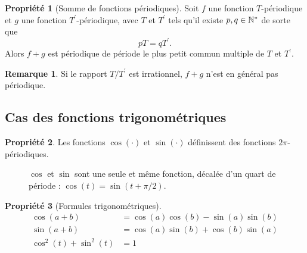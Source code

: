\documentclass[a4paper,11pt]{article}
\theoremstyle{definition}
\newtheorem{proposition}{Propriété}[section]
\newtheorem{remark}{Remarque}[section]
\begin{document}
\begin{proposition}[Somme de fonctions périodiques]
    Soit $f$ une fonction $T$-périodique et $g$ une fonction $T^\prime$-périodique, avec $T$ et $T^\prime$ tels qu'il existe $p,q\in{\mathbb{N}}^*$ de sorte que
    $$
        pT = qT^\prime.
    $$
    Alors $f+g$ est périodique de période le plus petit commun multiple de $T$ et $T^\prime$.
\end{proposition}

\begin{remark}
    Si le rapport $T/T^\prime$ est irrationnel, $f+g$ n'est en général pas périodique.
\end{remark}


\subsection{Cas des fonctions trigonométriques}


\begin{proposition}
    Les fonctions $\cos(\cdot)$ et $\sin(\cdot)$ définissent des fonctions $2\pi$-périodiques.
\end{proposition}

\begin{figure}[h]
    \centering
    \caption{$\cos$ et $\sin$ sont une seule et même fonction, décalée d'un quart de période : $\cos(t) = \sin(t+\pi/2)$.}
\end{figure}

\begin{proposition}[Formules trigonométriques]

    $$
    \begin{aligned}
        \cos(a+b) &= \cos(a)\cos(b) - \sin(a)\sin(b)\\
        \sin(a+b) &= \cos(a)\sin(b) + \cos(b)\sin(a)\\
        \cos^2(t) + \sin^2(t) &= 1
    \end{aligned}
    $$

\end{proposition}
\end{document}
